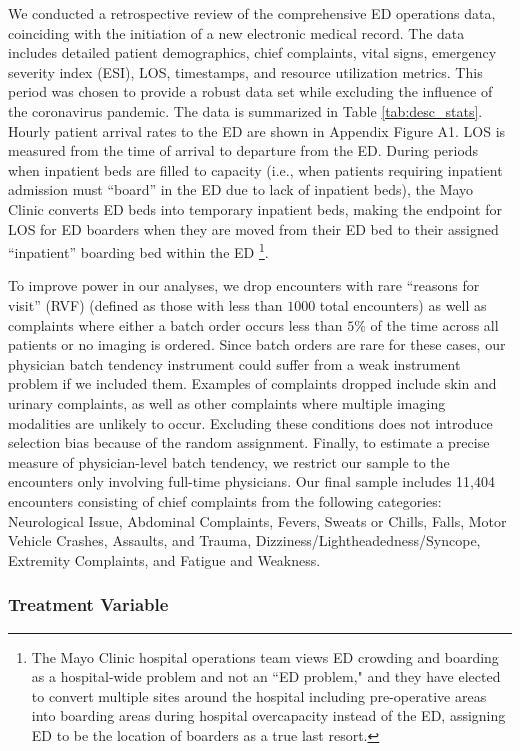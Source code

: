 \documentclass[,,nonblindrev]{informs}
\begin{document}
We conducted a retrospective review of the comprehensive ED operations
data, coinciding with the initiation of a new electronic medical record.
The data includes detailed patient demographics, chief complaints, vital
signs, emergency severity index (ESI), LOS, timestamps, and resource
utilization metrics. This period was chosen to provide a robust data set
while excluding the influence of the coronavirus pandemic. The data is
summarized in Table \ref{tab:desc_stats}. Hourly patient arrival rates
to the ED are shown in Appendix Figure A1. LOS is measured from the time
of arrival to departure from the ED. During periods when inpatient beds
are filled to capacity (i.e., when patients requiring inpatient
admission must ``board'' in the ED due to lack of inpatient beds), the
Mayo Clinic converts ED beds into temporary inpatient beds, making the
endpoint for LOS for ED boarders when they are moved from their ED bed
to their assigned ``inpatient'' boarding bed within the ED
\footnote{The Mayo Clinic hospital operations team views ED crowding and boarding as a hospital-wide problem and not an ``ED problem," and they have elected to convert multiple sites around the hospital including pre-operative areas into boarding areas during hospital overcapacity instead of the ED, assigning ED to be the location of boarders as a true last resort.}.

To improve power in our analyses, we drop encounters with rare ``reasons
for visit'' (RVF) (defined as those with less than \(1000\) total
encounters) as well as complaints where either a batch order occurs less
than \(5\%\) of the time across all patients or no imaging is ordered.
Since batch orders are rare for these cases, our physician batch
tendency instrument could suffer from a weak instrument problem if we
included them. Examples of complaints dropped include skin and urinary
complaints, as well as other complaints where multiple imaging
modalities are unlikely to occur. Excluding these conditions does not
introduce selection bias because of the random assignment. Finally, to
estimate a precise measure of physician-level batch tendency, we
restrict our sample to the encounters only involving full-time
physicians. Our final sample includes 11,404 encounters consisting of
chief complaints from the following categories: Neurological Issue,
Abdominal Complaints, Fevers, Sweats or Chills, Falls, Motor Vehicle
Crashes, Assaults, and Trauma, Dizziness/Lightheadedness/Syncope,
Extremity Complaints, and Fatigue and Weakness.

\subsubsection{Treatment Variable}\label{treatment-variable}
\end{document}
